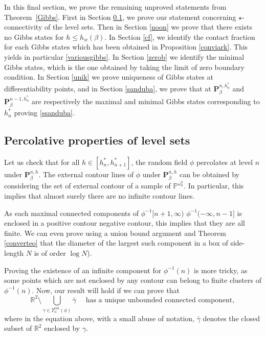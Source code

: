 \documentclass[JEP,XML,SOM,Unicode, NoFloatCountersInSection]{cedram}
\numberwithin{equation}{section}
\theoremstyle{plain}
\theoremstyle{definition}
\newcommand{\ext}{\mathrm{ext}}
\newcommand{\bP}{{\ensuremath{\mathbf P}} }
\newcommand{\bbP}{{\ensuremath{\mathbb P}} }
\newcommand{\bbR}{{\ensuremath{\mathbb R}} }
\newcommand{\gb}{\beta}
\newcommand{\go}{\omega}
\begin{document}
In this final section, we prove the remaining unproved statements from Theorem~\ref{Gibbs}.
First in Section \ref{start}, we prove our statement concerning $\star$-connectivity of the level sets.
Then in Section \ref{noon} we prove that there exists no Gibbs states for $h\le h_w(\gb)$.
In Section \ref{cf}, we identify the contact fraction for each Gibbs states which has been obtained in Proposition \ref{conviark}.
This yields in particular \eqref{variousgibbs}.
In Section \ref{zerob} we identify the minimal Gibbs states, which is the one obtained by taking the limit of zero boundary condition.
In Section \ref{unik} we prove uniqueness of Gibbs states at differentiability points, and in Section \ref{sanduba}, we prove that at
$\bP^{n,h^*_n}_{\gb}$ and $\bP^{n-1,h^*_n}_{\gb}$ are respectively the maximal and minimal Gibbs states corresponding to $h^*_n$ proving \eqref{ssanduba}.

\subsection{Percolative properties of level sets}\label{start}

Let us check that for all $h\in [h^*_n,h^*_{n+1}]$, the random field $\phi$ percolates at level $n$ under $\bP^{n,h}_{\gb}$.
The external contour lines of $\phi$ under $\bP^{n,h}_{\gb}$ can be obtained by considering the set of external contour of a sample of
$\bbP^{\go^h_n}$. In particular, this implies that almost surely there are no infinite contour lines.

As each maximal connected components of $\phi^{-1}[n+1,\infty)$ \resp $\phi^{-1}(-\infty,n-1]$ is enclosed in a positive contour \resp negative contour,
this implies that they are all finite. We can even prove using a union bound argument and Theorem \ref{converteo} that the diameter of the
largest such component in a box of side-length $N$ is of order $\log N$).

Proving the existence of an infinite component for $\phi^{-1}(n)$ is more tricky, as some points which are not enclosed by any contour can belong to finite clusters of
$\phi^{-1}(n)$. Now, our result will hold if we can prove that
\begin{equation}\label{thatsallfolks}
\bbR^2\setminus \bigcup_{\gamma\in \Upsilon^{\ext}_n(\phi)} \bar \gamma \quad \text{ has a unique unbounded connected component},
\end{equation}
where in the equation above, with a small abuse of notation, $\bar \gamma$ denotes the closed subset of $\bbR^2$ enclosed by $\gamma$.
\end{document}
